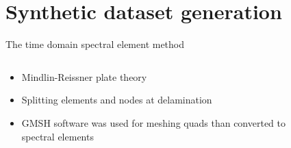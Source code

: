 \documentclass[10pt,aspectratio=169,dvipsnames]{beamer} %
\begin{document}
	\section{Synthetic dataset generation}
	\begin{frame}{The time domain spectral element method}
	\begin{columns}[T]
		\begin{column}{0.47\textwidth}
			\begin{itemize}
				\item Mindlin-Reissner plate theory
				\item Splitting elements and nodes at delamination
				\item GMSH software was used for meshing quads than converted to spectral elements
			\end{itemize}	
			\begin{figure}
			\end{figure}
		\end{column}
		\begin{column}{0.47\textwidth}	
			\begin{figure}
			\end{figure}	
		\end{column}
	\end{columns}	
	\end{frame}
\end{document}

